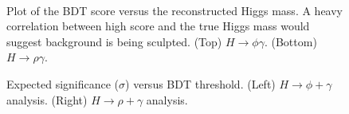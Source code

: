 \begin{figure}[htb]
\begin{center}
\\
\end{center}
\caption{Plot of the BDT score versus the reconstructed Higgs mass. A heavy correlation between high score and the true Higgs mass would suggest background is being sculpted. (Top) $H\rightarrow\phi\gamma$. (Bottom) $H\rightarrow\rho\gamma$.}
\label{fig:bdt-bkgsculpt1}
\end{figure}

\begin{figure}[htb]
\begin{center}
\quad
{}
\end{center}
\caption{Expected significance ($\sigma$) versus BDT threshold. (Left) $H\rightarrow\phi+\gamma$ analysis. (Right) $H\rightarrow\rho+\gamma$ analysis.}
\label{fig:bdt-data-expsig}
\end{figure}

